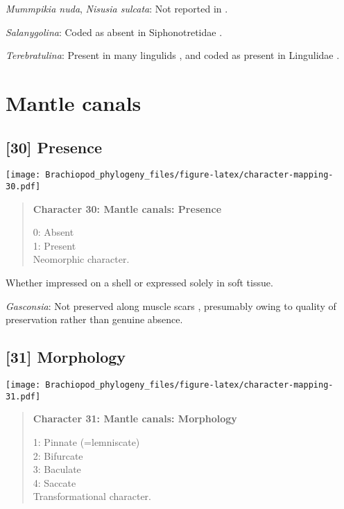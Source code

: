 \documentclass[openany]{book}
\theoremstyle{definition}
\theoremstyle{definition}
\theoremstyle{definition}
\theoremstyle{remark}
\begin{document}
\hypertarget{Mummpikia_nuda-coding-29}{}
\emph{Mummpikia nuda}, \emph{Nisusia sulcata}: Not reported in
\citet{Williams2000LinguliformeaCraniiformea}.

\hypertarget{Salanygolina-coding-29}{}
\emph{Salanygolina}: Coded as absent in Siphonotretidae \citep[table
6]{Williams2000LinguliformeaCraniiformea}.

\hypertarget{Terebratulina-coding-29}{}
\emph{Terebratulina}: Present in many lingulids
\citep{Williams2000LinguliformeaCraniiformea}, and coded as present in
Lingulidae \citep[table 6]{Williams2000LinguliformeaCraniiformea}.

\section{Mantle canals}\label{mantle-canals}

\subsection*{{[}30{]} Presence}\label{presence}

\texttt{[image: Brachiopod\_phylogeny\_files/figure-latex/character-mapping-30.pdf]}

\begin{quote}
\textbf{Character 30: Mantle canals: Presence}

0: Absent\\
1: Present\\
Neomorphic character.
\end{quote}

Whether impressed on a shell or expressed solely in soft tissue.

\hypertarget{Gasconsia-coding-30}{}
\emph{Gasconsia}: Not preserved along muscle scars \citep{Nikitin1984},
presumably owing to quality of preservation rather than genuine absence.

\subsection*{{[}31{]} Morphology}\label{morphology-1}

\texttt{[image: Brachiopod\_phylogeny\_files/figure-latex/character-mapping-31.pdf]}

\begin{quote}
\textbf{Character 31: Mantle canals: Morphology}

1: Pinnate (=lemniscate)\\
2: Bifurcate\\
3: Baculate\\
4: Saccate\\
Transformational character.
\end{quote}
\end{document}
